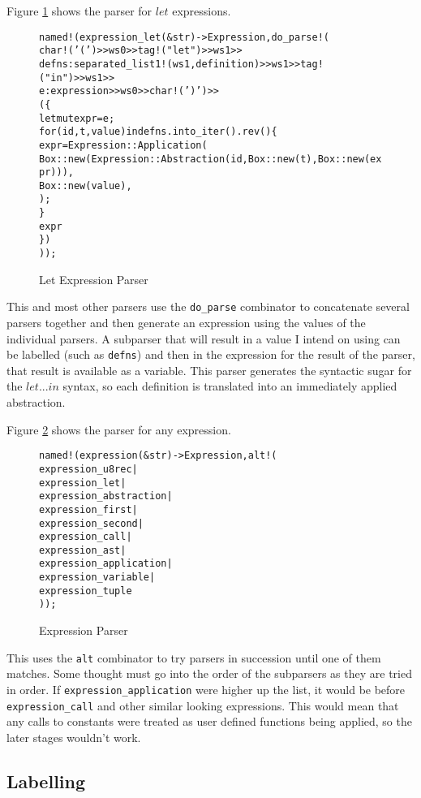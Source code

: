 Figure \ref{fig:let_expression_parser} shows the parser for $let$ expressions.
\begin{figure}
    \begin{alltt}
named!(expression_let(&str) -> Expression, do_parse!(
  char!('(') >> ws0 >> tag!("let") >> ws1 >>
  defns: separated_list1!(ws1, definition) >> ws1 >> tag!("in") >> ws1 >>
  e: expression >> ws0 >> char!(')') >>
  (\{
    let mut expr = e;
    for (id, t, value) in defns.into_iter().rev() \{
      expr = Expression::Application(
        Box::new(Expression::Abstraction(id, Box::new(t), Box::new(expr))),
        Box::new(value),
      );
    \}
    expr
  \})
));
    \end{alltt}
    \caption{Let Expression Parser}
    \label{fig:let_expression_parser}
\end{figure}
This and most other parsers use the \texttt{do\_parse} combinator to concatenate several parsers together and then
generate an expression using the values of the individual parsers.
A subparser that will result in a value I intend on using can be labelled (such as \texttt{defns}) and then in
the expression for the result of the parser, that result is available as a variable.
This parser generates the syntactic sugar for the $let...in$ syntax, so each definition is translated into
an immediately applied abstraction.

Figure \ref{fig:expression_parser} shows the parser for any expression.
\begin{figure}
    \begin{alltt}
named!(expression(&str) -> Expression, alt!(
  expression_u8rec |
  expression_let |
  expression_abstraction |
  expression_first |
  expression_second |
  expression_call |
  expression_ast |
  expression_application |
  expression_variable |
  expression_tuple
));
    \end{alltt}
    \caption{Expression Parser}
    \label{fig:expression_parser}
\end{figure}
This uses the \texttt{alt} combinator to try parsers in succession until one of them matches.
Some thought must go into the order of the subparsers as they are tried in order.
If \texttt{expression\_application} were higher up the list, it would be before \texttt{expression\_call} and
other similar looking expressions.
This would mean that any calls to constants were treated as user defined functions being applied, so the
later stages wouldn't work.

\subsection{Labelling}

